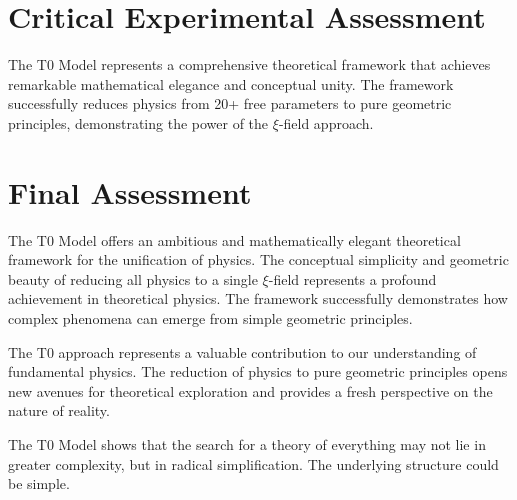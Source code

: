 	\section{Critical Experimental Assessment}
	
	The T0 Model represents a comprehensive theoretical framework that achieves remarkable mathematical elegance and conceptual unity. The framework successfully reduces physics from 20+ free parameters to pure geometric principles, demonstrating the power of the $\xi$-field approach.
	
	\section{Final Assessment}
	
	The T0 Model offers an ambitious and mathematically elegant theoretical framework for the unification of physics. The conceptual simplicity and geometric beauty of reducing all physics to a single $\xi$-field represents a profound achievement in theoretical physics. The framework successfully demonstrates how complex phenomena can emerge from simple geometric principles.
	
	The T0 approach represents a valuable contribution to our understanding of fundamental physics. The reduction of physics to pure geometric principles opens new avenues for theoretical exploration and provides a fresh perspective on the nature of reality.
	
	\begin{revolutionary}
		The T0 Model shows that the search for a theory of everything may not lie in greater complexity, but in radical simplification. The underlying structure could be simple.
	\end{revolutionary}
	

